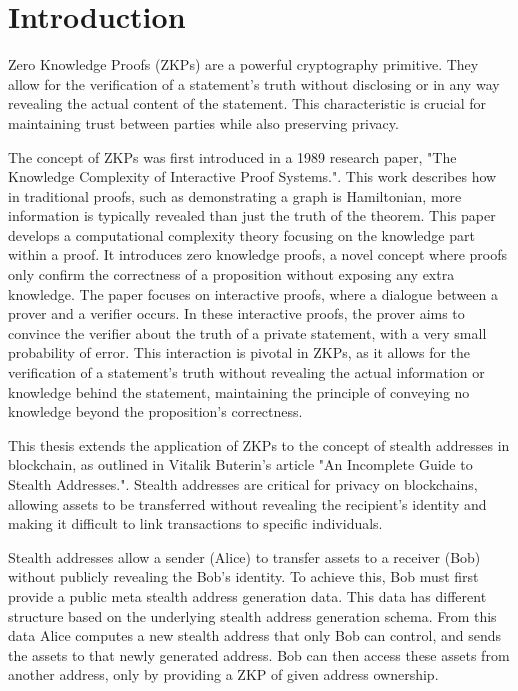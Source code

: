 \chapter{Introduction}

Zero Knowledge Proofs (ZKPs) are a powerful cryptography primitive. They allow
for the verification of a statement's truth without disclosing or in any way revealing
the actual content of the statement. This characteristic is crucial for
maintaining trust between parties while also preserving privacy.

The concept of ZKPs was first introduced in a 1989 research paper, "The
Knowledge Complexity of Interactive Proof Systems."\cite{Goldwasser1989}.
This work describes how in traditional proofs, such as demonstrating a graph
is Hamiltonian, more information is typically revealed than just the truth of
the theorem. This paper develops a computational complexity theory focusing
on the knowledge part within a proof. It introduces zero knowledge proofs,
a novel concept where proofs only confirm the correctness of a proposition
without exposing any extra knowledge. The paper focuses on interactive
proofs, where a dialogue between a prover and a verifier occurs. In these
interactive proofs, the prover aims to convince the verifier about the truth
of a private statement, with a very small probability of error. This
interaction is pivotal in ZKPs, as it allows for the verification of a
statement's truth without revealing the actual information or knowledge
behind the statement, maintaining the principle of conveying no
knowledge beyond the proposition's correctness.

This thesis extends the application of ZKPs to the concept of stealth
addresses in blockchain, as outlined in Vitalik Buterin's article "An
Incomplete Guide to Stealth Addresses."\cite{ButerinIncompleteGuide}.
Stealth addresses are critical for privacy on blockchains, allowing assets to
be transferred without revealing the recipient's identity and making
it difficult to link transactions to specific individuals.

Stealth addresses allow a sender (Alice) to transfer assets to a receiver (Bob) without
publicly revealing the Bob's identity. To achieve this, Bob
must first provide a public meta stealth address generation data. This data
has different structure based on the underlying stealth address generation
schema. From this data Alice computes a new stealth address that only Bob can
control, and sends the assets to that newly generated address. Bob can then
access these assets from another address, only by providing a ZKP of given
address ownership.

